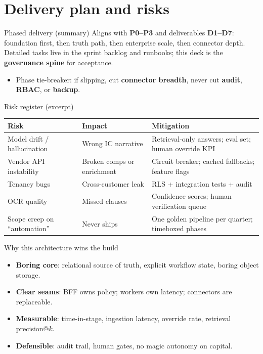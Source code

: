 \documentclass[aspectratio=169,11pt]{beamer}
\begin{document}
\section{Delivery plan and risks}

\begin{frame}{Phased delivery (summary)}
  \small
  Aligns with \textbf{P0--P3} and deliverables \textbf{D1--D7}: foundation first, then truth path, then enterprise scale, then connector depth. Detailed tasks live in the sprint backlog and runbooks; this deck is the \textbf{governance spine} for acceptance.
  \vspace{0.5em}
  \begin{itemize}\itemsep2pt
    \item Phase tie-breaker: if slipping, cut \textbf{connector breadth}, never cut \textbf{audit}, \textbf{RBAC}, or \textbf{backup}.
  \end{itemize}
\end{frame}

\begin{frame}{Risk register (excerpt)}
  \tiny
  \begin{tabular}{p{3.8cm}p{4.2cm}p{4.5cm}}
    \textbf{Risk} & \textbf{Impact} & \textbf{Mitigation} \\
    \hline
    Model drift / hallucination & Wrong IC narrative & Retrieval-only answers; eval set; human override KPI \\
    Vendor API instability & Broken comps or enrichment & Circuit breaker; cached fallbacks; feature flags \\
    Tenancy bugs & Cross-customer leak & RLS + integration tests + audit \\
    OCR quality & Missed clauses & Confidence scores; human verification queue \\
    Scope creep on ``automation'' & Never ships & One golden pipeline per quarter; timeboxed phases \\
  \end{tabular}
\end{frame}

\begin{frame}{Why this architecture wins the build}
  \small
  \begin{itemize}
    \item \textbf{Boring core}: relational source of truth, explicit workflow state, boring object storage.
    \item \textbf{Clear seams}: BFF owns policy; workers own latency; connectors are replaceable.
    \item \textbf{Measurable}: time-in-stage, ingestion latency, override rate, retrieval precision@$k$.
    \item \textbf{Defensible}: audit trail, human gates, no magic autonomy on capital.
  \end{itemize}
\end{frame}
\end{document}
